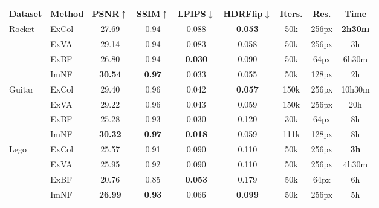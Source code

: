 \begingroup
\begin{table*}[!htb]
    \centering
    \begin{tabular*}{\textwidth}{ l | l | c c c c | c c c }
        Dataset & Method & PSNR$\uparrow$ & SSIM$\uparrow$ & LPIPS$\downarrow$ & HDRFlip$\downarrow$ & Iters. & Res. & Time \\
        \midrule
        
        \multirow{4}{*}{Rocket}
        & ExCol & 27.69 & 0.94 & 0.088 & \textbf{0.053} & 50k & 256px & \textbf{2h30m} \\
        & ExVA & 29.14 & 0.94 & 0.083 & 0.058 & 50k & 256px & 3h \\
        & ExBF & 26.80 & 0.94 & \textbf{0.030} & 0.090 & 50k & \color{gray}64px & \color{gray}6h30m \\
        & ImNF & \textbf{30.54} & \textbf{0.97} & 0.033 & 0.055 & 50k & \color{burgundy}128px & \color{burgundy}2h \\
        \midrule
        
        \multirow{4}{*}{Guitar}
        & ExCol & 29.40 & 0.96 & 0.042 & \textbf{0.057} & 150k & 256px & 10h30m \\
        & ExVA & 29.22 & 0.96 & 0.043 & 0.059 & 150k & 256px & 20h \\
        & \color{gray}ExBF & \color{gray}25.28 & \color{gray}0.93 & \color{gray}0.030 & \color{gray}0.120 & \color{gray}30k & \color{gray}64px & \color{gray}8h \\
        & ImNF & \textbf{30.32} & \textbf{0.97} & \textbf{0.018} & 0.059 & 111k & \color{burgundy}128px & \color{burgundy}8h \\
        \midrule
        
        \multirow{4}{*}{Lego}
        & ExCol & 25.57 & 0.91 & 0.090 & 0.110 & 50k & 256px & \textbf{3h} \\
        & ExVA & 25.95 & 0.92 & 0.090 & 0.110 & 50k & 256px & 4h30m \\
        & ExBF & 20.76 & 0.85 & \textbf{0.053} & 0.179 & 50k & \color{gray}64px & \color{gray}6h \\
        & ImNF & \textbf{26.99} & \textbf{0.93} & 0.066 & \textbf{0.099} & 50k & 256px & 5h \\
        \midrule
        

\end{tabular*}
\end{table*}

